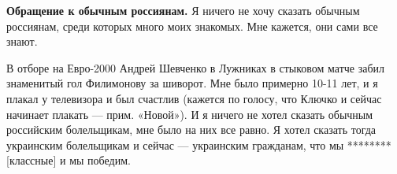 \textbf{Обращение к обычным россиянам.} Я ничего не хочу сказать обычным россиянам, среди которых много моих знакомых. Мне кажется, они сами все знают.

В отборе на Евро-2000 Андрей Шевченко в Лужниках в стыковом матче забил знаменитый гол Филимонову за шиворот. Мне было примерно 10-11 лет, и я плакал у телевизора и был счастлив (кажется по голосу, что Ключко и сейчас начинает плакать — прим. «Новой»). И я ничего не хотел сказать обычным российским болельщикам, мне было на них все равно. Я хотел сказать тогда украинским болельщикам и сейчас — украинским гражданам, что мы ******** [классные] и мы победим.